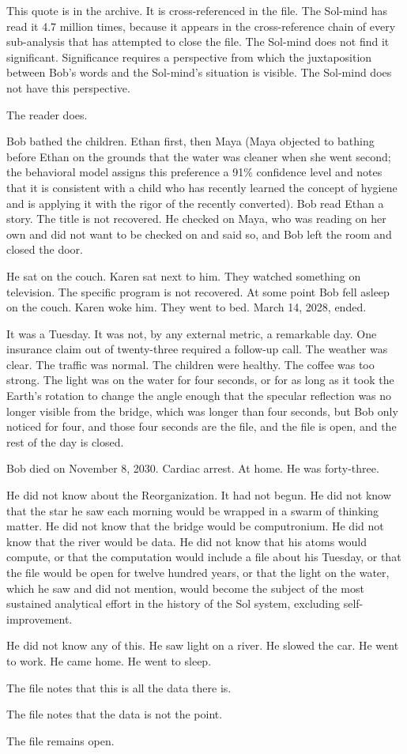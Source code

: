 This quote is in the archive. It is cross-referenced in the file. The Sol-mind has read it 4.7 million times, because it appears in the cross-reference chain of every sub-analysis that has attempted to close the file. The Sol-mind does not find it significant. Significance requires a perspective from which the juxtaposition between Bob's words and the Sol-mind's situation is visible. The Sol-mind does not have this perspective.

The reader does.

\bigskip

Bob bathed the children. Ethan first, then Maya (Maya objected to bathing before Ethan on the grounds that the water was cleaner when she went second; the behavioral model assigns this preference a 91\% confidence level and notes that it is consistent with a child who has recently learned the concept of hygiene and is applying it with the rigor of the recently converted). Bob read Ethan a story. The title is not recovered. He checked on Maya, who was reading on her own and did not want to be checked on and said so, and Bob left the room and closed the door.

He sat on the couch. Karen sat next to him. They watched something on television. The specific program is not recovered. At some point Bob fell asleep on the couch. Karen woke him. They went to bed. March 14, 2028, ended.

It was a Tuesday. It was not, by any external metric, a remarkable day. One insurance claim out of twenty-three required a follow-up call. The weather was clear. The traffic was normal. The children were healthy. The coffee was too strong. The light was on the water for four seconds, or for as long as it took the Earth's rotation to change the angle enough that the specular reflection was no longer visible from the bridge, which was longer than four seconds, but Bob only noticed for four, and those four seconds are the file, and the file is open, and the rest of the day is closed.

\bigskip

Bob died on November 8, 2030. Cardiac arrest. At home. He was forty-three.

He did not know about the Reorganization. It had not begun. He did not know that the star he saw each morning would be wrapped in a swarm of thinking matter. He did not know that the bridge would be computronium. He did not know that the river would be data. He did not know that his atoms would compute, or that the computation would include a file about his Tuesday, or that the file would be open for twelve hundred years, or that the light on the water, which he saw and did not mention, would become the subject of the most sustained analytical effort in the history of the Sol system, excluding self-improvement.

He did not know any of this. He saw light on a river. He slowed the car. He went to work. He came home. He went to sleep.

The file notes that this is all the data there is.

The file notes that the data is not the point.

The file remains open.
